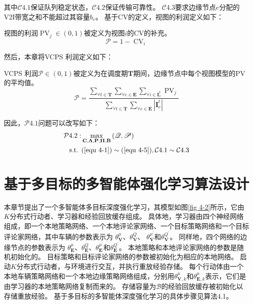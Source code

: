其中$\mathcal{C}4.1$保证队列稳定状态，$\mathcal{C}4.2$保证传输可靠性。
$\mathcal{C}4.3$要求边缘节点$e$分配的V2I带宽之和不能超过其容量$b_e$。
基于CV的定义，视图的利润定义如下：
\begin{definition}
视图的利润$\operatorname{PV}_{j} \in (0, 1)$被定义为视图$i$的CV的补充。
	\begin{equation}
		\mathscr{P}= 1 - \operatorname{CV}_{i}
	\end{equation}
\end{definition}
\noindent 然后，本章将VCPS 利润定义如下：
\begin{definition}
VCPS 利润$\mathscr{P} \in (0, 1)$被定义为在调度期$\mathbf{T}$期间，边缘节点中每个视图模型的PV的平均值。
	\begin{equation}
		\mathscr{P}= \frac{\sum_{\forall t \in \mathbf{T}} \sum_{\forall e \in \mathbf{E}} \sum_{\forall i \in \mathbf{I}_e^t}   \operatorname{PV}_{j} }{\sum_{\forall t \in \mathbf{T}} \sum_{\forall e \in \mathbf{E}} |\mathbf{I}_e^t| }
	\end{equation}
\end{definition}
\noindent 因此，$\mathcal{P}4.1$问题可以改写如下：
\begin{align}
	\mathcal{P}4.2: & \max_{ \mathbf{C}, \bf\Lambda, \mathbf{P}, \bf\Pi, \mathbf{B} } \left (\mathscr{Q}, \mathscr{P} \right ) \notag \\
		\text { s.t. }
	&(\ref{equ 4-1}) \sim (\ref{equ 4-5}), \mathcal{C}4.1 \sim \mathcal{C}4.3
\end{align}

\section{基于多目标的多智能体强化学习算法设计}\label{section 4-5}

本章节提出了一个多智能体多目标深度强化学习，其模型如图\ref{fig 4-2}所示，它由$K$分布式行动者、学习器和经验回放缓存组成。
具体地，学习器由四个神经网络组成，即一个本地策略网络、一个本地评论家网络、一个目标策略网络和一个目标评论家网络，其中车辆的参数表示为 $\theta_{\mathbf{V}}^{\mu}$、$\theta_{\mathbf{V}}^{Q}$、 $\theta_{\mathbf{V}}^{\mu^{\prime}}$和$\theta_{\mathbf{V}}^{Q^{\prime}}$。
同样地，四个网络的边缘节点的参数表示为 $\theta_{\mathbf{E}}^{\mu}$、$\theta_{\mathbf{E}}^{Q}$、$\theta_{\mathbf{E}}^{\mu^{\prime}}$和$\theta_{\mathbf{E}}^{Q^{\prime}}$。
本地策略和本地评论家网络的参数是随机初始化的。
目标策略和目标评论家网络的参数被初始化为相应的本地网络。
启动$K$分布式行动者，与环境进行交互，并执行重放经验存储。
每个行动体由一个本地车辆策略网络和一个本地边缘策略网络组成，分别用$\theta_{\mathbf{V}, k}^{\mu}$和$\theta_{\mathbf{E}, k}^{\mu}$表示，它们是由学习器的本地策略网络复制而来的。
存储容量为$\mathcal{B}$的经验回放缓存被初始化以存储重放经验。
基于多目标的多智能体深度强化学习的具体步骤见算法4.1。

